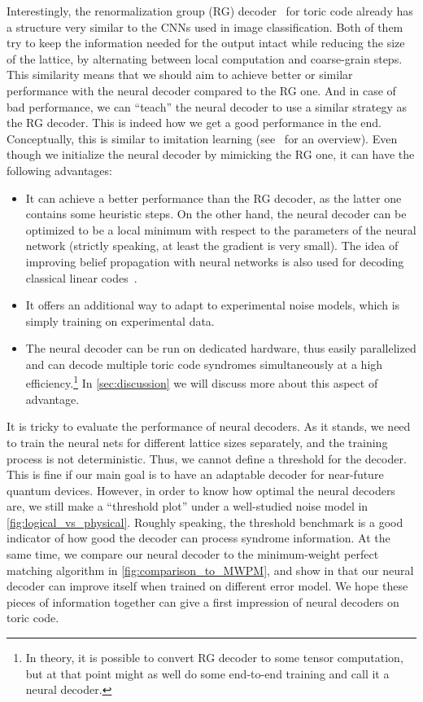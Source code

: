 Interestingly, the renormalization group (RG) decoder~\cite{duclos2010fast,duclos2013fault} for toric code already has a structure very similar to the CNNs used in image classification.
Both of them try to keep the information needed for the output intact while reducing the size of the lattice, by alternating between local computation and coarse-grain steps.
This similarity means that we should aim to achieve better or similar performance with the neural decoder compared to the RG one.
And in case of bad performance, we can ``teach'' the neural decoder to use a similar strategy as the RG decoder.
This is indeed how we get a good performance in the end.
Conceptually, this is similar to imitation learning (see~\cite{Attia2018Globaloverviewof} for an overview).
Even though we initialize the neural decoder by mimicking the RG one, it can have the following advantages:
\begin{itemize}
	\item It can achieve a better performance than the RG decoder, as the latter one contains some heuristic steps. On the other hand, the neural decoder can be optimized to be a local minimum with respect to the parameters of the neural network (strictly speaking, at least the gradient is very small).
	The idea of improving belief propagation with neural networks is also used for decoding classical linear codes~\cite{Nachmani2016Learningtodecode}.
	\item It offers an additional way to adapt to experimental noise models, which is simply training on experimental data.
	\item The neural decoder can be run on dedicated hardware, thus easily parallelized and can decode multiple toric code syndromes simultaneously at a high efficiency.\footnote{In theory, it is possible to convert RG decoder to some tensor computation, but at that point might as well do some end-to-end training and call it a neural decoder.} In \autoref{sec:discussion} we will discuss more about this aspect of advantage.
\end{itemize}

It is tricky to evaluate the performance of neural decoders.
As it stands, we need to train the neural nets for different lattice sizes separately, and the training process is not deterministic.
Thus, we cannot define a threshold for the decoder.
This is fine if our main goal is to have an adaptable decoder for near-future quantum devices.
However, in order to know how optimal the neural decoders are, we still make a ``threshold plot'' under a well-studied noise model in \autoref{fig:logical_vs_physical}.
Roughly speaking, the threshold benchmark is a good indicator of how good the decoder can process syndrome information.
At the same time, we compare our neural decoder to the minimum-weight perfect matching algorithm in \autoref{fig:comparison_to_MWPM}, and show in  that our neural decoder can improve itself when trained on different error model.
We hope these pieces of information together can give a first impression of neural decoders on toric code.

